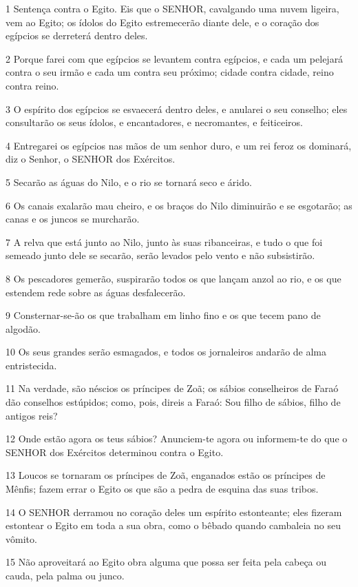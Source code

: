 \par 1 Sentença contra o Egito. Eis que o SENHOR, cavalgando uma nuvem ligeira, vem ao Egito; os ídolos do Egito estremecerão diante dele, e o coração dos egípcios se derreterá dentro deles.
\par 2 Porque farei com que egípcios se levantem contra egípcios, e cada um pelejará contra o seu irmão e cada um contra seu próximo; cidade contra cidade, reino contra reino.
\par 3 O espírito dos egípcios se esvaecerá dentro deles, e anularei o seu conselho; eles consultarão os seus ídolos, e encantadores, e necromantes, e feiticeiros.
\par 4 Entregarei os egípcios nas mãos de um senhor duro, e um rei feroz os dominará, diz o Senhor, o SENHOR dos Exércitos.
\par 5 Secarão as águas do Nilo, e o rio se tornará seco e árido.
\par 6 Os canais exalarão mau cheiro, e os braços do Nilo diminuirão e se esgotarão; as canas e os juncos se murcharão.
\par 7 A relva que está junto ao Nilo, junto às suas ribanceiras, e tudo o que foi semeado junto dele se secarão, serão levados pelo vento e não subsistirão.
\par 8 Os pescadores gemerão, suspirarão todos os que lançam anzol ao rio, e os que estendem rede sobre as águas desfalecerão.
\par 9 Consternar-se-ão os que trabalham em linho fino e os que tecem pano de algodão.
\par 10 Os seus grandes serão esmagados, e todos os jornaleiros andarão de alma entristecida.
\par 11 Na verdade, são néscios os príncipes de Zoã; os sábios conselheiros de Faraó dão conselhos estúpidos; como, pois, direis a Faraó: Sou filho de sábios, filho de antigos reis?
\par 12 Onde estão agora os teus sábios? Anunciem-te agora ou informem-te do que o SENHOR dos Exércitos determinou contra o Egito.
\par 13 Loucos se tornaram os príncipes de Zoã, enganados estão os príncipes de Mênfis; fazem errar o Egito os que são a pedra de esquina das suas tribos.
\par 14 O SENHOR derramou no coração deles um espírito estonteante; eles fizeram estontear o Egito em toda a sua obra, como o bêbado quando cambaleia no seu vômito.
\par 15 Não aproveitará ao Egito obra alguma que possa ser feita pela cabeça ou cauda, pela palma ou junco.

